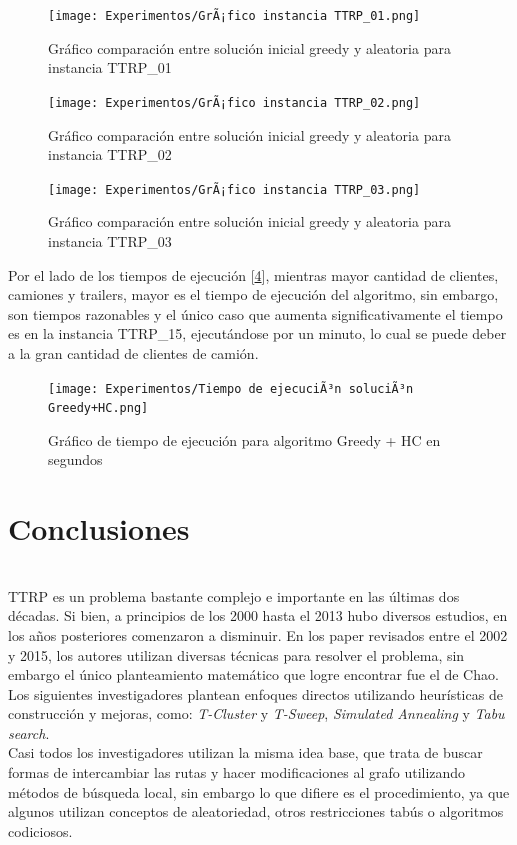 \documentclass[letter, 10pt]{article}
\begin{document}
\begin{figure}[h!]
    \centering
    
    \texttt{[image: Experimentos/GrÃ¡fico instancia TTRP\_01.png]}
    \caption{Gráfico comparación entre solución inicial greedy y aleatoria para instancia TTRP\_01}
    \label{fig:g1}
\end{figure}

\begin{figure}[h!]
    \centering
    \texttt{[image: Experimentos/GrÃ¡fico instancia TTRP\_02.png]}
    \caption{Gráfico comparación entre solución inicial greedy y aleatoria para instancia TTRP\_02}
    \label{fig:g2}
\end{figure}


\begin{figure}[h!]
    \centering
    \texttt{[image: Experimentos/GrÃ¡fico instancia TTRP\_03.png]}
    \caption{Gráfico comparación entre solución inicial greedy y aleatoria para instancia TTRP\_03}
    \label{fig:g3}
\end{figure}
Por el lado de los tiempos de ejecución [\ref{fig:tiempos}], mientras mayor cantidad de clientes, camiones y trailers, mayor es el tiempo de ejecución del algoritmo, sin embargo, son tiempos razonables y el único caso que aumenta significativamente el tiempo es en la instancia TTRP\_15, ejecutándose por un minuto, lo cual se puede deber a la gran cantidad de clientes de camión.
\begin{figure}[h!]
    \centering
    \texttt{[image: Experimentos/Tiempo de ejecuciÃ³n soluciÃ³n Greedy+HC.png]}
    \caption{Gráfico de tiempo de ejecución para algoritmo Greedy + HC en segundos}
    \label{fig:tiempos}
\end{figure}
\newpage
\newpage
\newpage
\section{Conclusiones}
\\
TTRP es un problema bastante complejo e importante en las últimas dos décadas. Si bien, a principios de los 2000 hasta el 2013 hubo diversos estudios, en los años posteriores comenzaron a disminuir. En los paper revisados entre el 2002 y 2015, los autores utilizan diversas técnicas para resolver el problema, sin embargo el único planteamiento matemático que logre encontrar fue el de Chao\cite{Chao}. Los siguientes investigadores plantean enfoques directos utilizando heurísticas de construcción y mejoras, como: \textit{T-Cluster} y \textit{T-Sweep}, \textit{Simulated Annealing} y \textit{Tabu search}.\\
Casi todos los investigadores utilizan la misma idea base, que trata de buscar formas de intercambiar las rutas y hacer modificaciones al grafo utilizando métodos de búsqueda local, sin embargo lo que difiere es el procedimiento, ya que algunos utilizan conceptos de aleatoriedad, otros restricciones tabús o algoritmos codiciosos.
\\
\\
\end{document}
